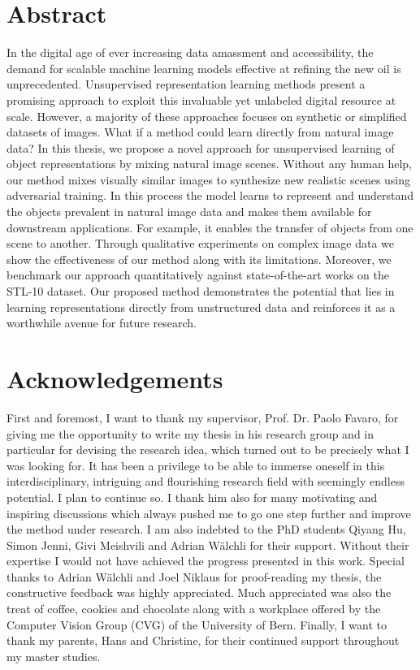\documentclass[a4paper,12pt]{report}
\begin{document}
\chapter*{Abstract}
In the digital age of ever increasing data amassment and accessibility, the demand for scalable machine learning models effective at refining the new oil is unprecedented. Unsupervised representation learning methods present a promising approach to exploit this invaluable yet unlabeled digital resource at scale. However, a majority of these approaches focuses on synthetic or simplified datasets of images. What if a method could learn directly from natural image data? In this thesis, we propose a novel approach for unsupervised learning of object representations by mixing natural image scenes. Without any human help, our method mixes visually similar images to synthesize new realistic scenes using adversarial training. In this process the model learns to represent and understand the objects prevalent in natural image data and makes them available for downstream applications. For example, it enables the transfer of objects from one scene to another. Through qualitative experiments on complex image data we show the effectiveness of our method along with its limitations. Moreover, we benchmark our approach quantitatively against state-of-the-art works on the STL-10 dataset. Our proposed method demonstrates the potential that lies in learning representations directly from unstructured data and reinforces it as a worthwhile avenue for future research.


\newpage
\chapter*{Acknowledgements}
First and foremost, I want to thank my supervisor, Prof. Dr. Paolo Favaro, for giving me the opportunity to write my thesis in his research group and in particular for devising the research idea, which turned out to be precisely what I was looking for. It has been a privilege to be able to immerse oneself in this interdisciplinary, intriguing and flourishing research field with seemingly endless potential. I plan to continue so. I thank him also for many motivating and inspiring discussions which always pushed me to go one step further and improve the method under research. I am also indebted to the PhD students Qiyang Hu, Simon Jenni, Givi Meishvili and Adrian Wälchli for their support. Without their expertise I would not have achieved the progress presented in this work. Special thanks to Adrian Wälchli and Joel Niklaus for proof-reading my thesis, the constructive feedback was highly appreciated. Much appreciated was also the treat of coffee, cookies and chocolate along with a workplace offered by the Computer Vision Group (CVG) of the University of Bern. Finally, I want to thank my parents, Hans and Christine, for their continued support throughout my master studies.
\end{document}
